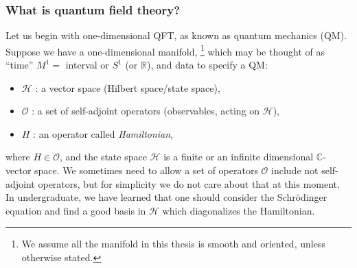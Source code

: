 \subsubsection{What is quantum field theory?}
\label{sec:what_is_qft}

Let us begin with one-dimensional QFT, as known as quantum mechanics
(QM). Suppose we have a one-dimensional manifold,%
%
\footnote{We assume all the manifold in this thesis is smooth and oriented,
unless otherwise stated. }%
%
which may be thought of as ``time'' $M^{1}=$ interval or $S^{1}$
(or $\mathbb{R}$), and data to specify a QM:
\begin{itemize}
  \item $\mathcal{H}$ : a vector space (Hilbert space/state space),
  \item $\mathcal{O}$ : a set of self-adjoint operators (observables, acting on $\mathcal{H}$),
  \item $H$ : an operator called \emph{Hamiltonian},
\end{itemize}
where $H\in\mathcal{O}$, and the state space $\mathcal{H}$ is a finite
or an infinite dimensional $\mathbb{C}$-vector space. We sometimes need
to allow a set of operators $\mathcal{O}$ include not self-adjoint
operators, but for simplicity we do not care about that at this moment.
In undergraduate, we have learned that one should consider the Schr\"{o}dinger
equation and find a good basis in $\mathcal{H}$ which diagonalizes the
Hamiltonian.

